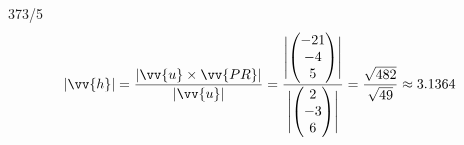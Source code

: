 \begin{exercise}{373/5}
\begin{gather*}
    |\vv{h}| = \frac{|\vv{u} \times \vv{PR}|}{|\vv{u}|} = \frac{\Biggl|\begin{pmatrix}-21 \\ -4 \\ 5\end{pmatrix}\Biggr|}{\Biggl|\begin{pmatrix}2 \\ -3 \\ 6\end{pmatrix}\Biggr|} = \frac{\sqrt{482}}{\sqrt{49}} \approx 3.1364
  \end{gather*}
\end{exercise}


